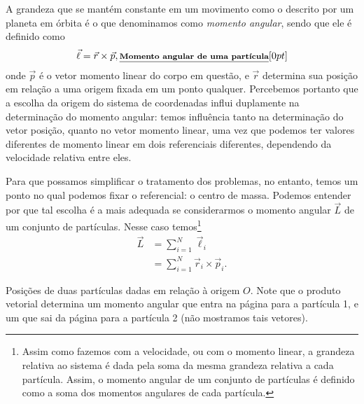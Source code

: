
A grandeza que se mantém constante em um movimento como o descrito por um planeta em órbita é o que denominamos como \emph{momento angular}, sendo que ele é definido como
\begin{equation}
    \vec{\ell} = \vec{r} \times \vec{p}, \relax{\footnotesize\emph{\textbf{Momento angular de uma partícula}}}[0pt]
\end{equation}
%
onde $\vec{p}$ é o vetor momento linear do corpo em questão, e $\vec{r}$ determina sua posição em relação a uma origem fixada em um ponto qualquer. Percebemos portanto que a escolha da origem do sistema de coordenadas influi duplamente na determinação do momento angular: temos influência tanto na determinação do vetor posição, quanto no vetor momento linear, uma vez que podemos ter valores diferentes de momento linear em dois referenciais diferentes, dependendo da velocidade relativa entre eles.

Para que possamos simplificar o tratamento dos problemas, no entanto, temos um ponto no qual podemos fixar o referencial: o centro de massa. Podemos entender por que tal escolha é a mais adequada se considerarmos o momento angular $\vec{L}$ de um conjunto de partículas. Nesse caso temos\footnote{Assim como fazemos com a velocidade, ou com o momento linear, a grandeza relativa ao sistema é dada pela soma da mesma grandeza relativa a cada partícula. Assim, o momento angular de um conjunto de partículas é definido como a soma dos momentos angulares de cada partícula.}
\begin{align}
    \vec{L} &= \sum_{i=1}^N \vec{\ell}_i \\
    &= \sum_{i=1}^N \vec{r}_i \times \vec{p}_i.
\end{align}

\begin{marginfigure}
\centering
{}
\caption{Posições de duas partículas dadas em relação à origem $O$. Note que o produto vetorial determina um momento angular que entra na página para a partícula 1, e um que sai da página para a partícula 2 (não mostramos tais vetores). \label{Fig:ParticulasPosicao}}
\end{marginfigure}

